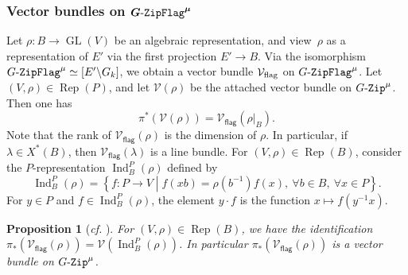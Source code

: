 \documentclass[11pt]{amsart}
\numberwithin{equation}{section}
\newtheorem{proposition}[theorem]{Proposition}
\theoremstyle{definition}
\theoremstyle{remark}
\newcommand{\GZip}{\mathop{\text{$G$-{\tt Zip}}}\nolimits}
\newcommand{\flag}{\mathsf{flag}}
\newcommand{\GF}{\mathop{\text{$G$-{\tt ZipFlag}}}\nolimits}
\newcommand{\Vcal}{{\mathcal V}}
\DeclareMathOperator{\Rep}{Rep}
\DeclareMathOperator{\GL}{GL}
\DeclareMathOperator{\Ind}{Ind}
\newcommand{\relmiddle}[1]{\mathrel{}\middle#1\mathrel{}}
\begin{document}
\subsubsection{Vector bundles on  \texorpdfstring{$\boldsymbol{\GF^\mu}$}{GF\textasciicircum mu}}
Let $\rho \colon B\to \GL(V)$ be an algebraic representation, and view~$\rho$ as a representation of $E'$ via the first projection $E'\to B$. Via the isomorphism $\GF^\mu\simeq [E'\backslash G_k]$, we obtain a vector bundle $\Vcal_{\rm flag}$ on $\GF^\mu$. Let $(V,\rho)\in \Rep(P)$, and let $\Vcal(\rho)$ be the attached vector bundle on $\GZip^\mu$. Then one has
\begin{equation}\label{pullbackV}
\pi^*(\Vcal(\rho))=\Vcal_{\flag}(\rho|_B).
\end{equation}
Note that the rank of $\Vcal_{\flag}(\rho)$ is the dimension of $\rho$. In particular, if $\lambda\in X^*(B)$, then $\Vcal_{\flag}(\lambda)$ is a line bundle. For $(V,\rho)\in \Rep(B)$, consider the $P$-representation $\Ind_B^P(\rho)$ defined by
\begin{equation}\label{eq-Indrho}
\Ind_B^P(\rho)=\left\{f\colon P\to V \relmiddle| f(xb) = \rho\left(b^{-1}\right)f(x), \ \forall b\in B,\ \forall x\in P \right\}.
\end{equation}
For $y\in P$ and $f\in \Ind_B^P(\rho)$, the element $y\cdot f$ is the function $x\mapsto f(y^{-1} x)$.

\begin{proposition}[\textit{cf.} {\cite[Proposition 3.2.1]{Imai-Koskivirta-partial-Hasse}}]\label{prop-push-flag-zip}
For $(V,\rho)\in \Rep(B)$, we have the identification 
$\pi_{*}(\Vcal_{\flag}(\rho))=\Vcal(\Ind_B^P(\rho))$. In particular $\pi_{*}(\Vcal_{\flag}(\rho))$ is a vector bundle on $\GZip^\mu$.
\end{proposition}
\end{document}
